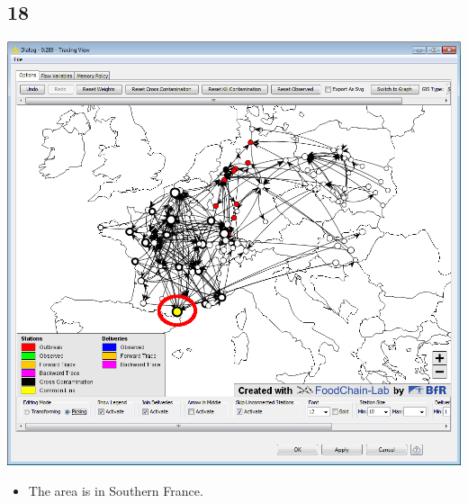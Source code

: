 \documentclass{beamer}
\begin{document}
\subsection{18}
\begin{frame}
	\begin{center}
  		\includegraphics[height=0.6\textheight]{18.png}
	\end{center}
	\begin{itemize}
		\item The area is in Southern France.
	\end{itemize}
\end{frame}
\end{document}
